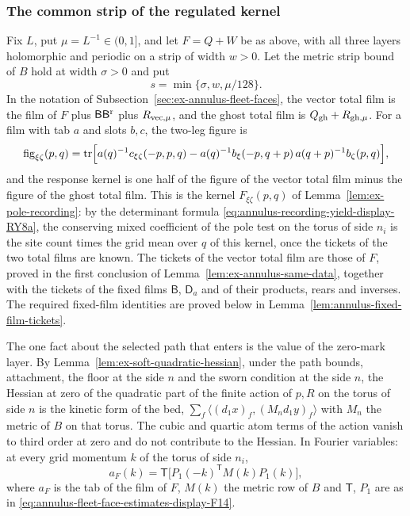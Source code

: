 \subsubsection{The common strip of the regulated kernel}

Fix $L$, put $\mu=L^{-1}\in(0,1]$, and let $F=Q+W$ be as above, with
all three layers holomorphic and periodic on a strip of width
$w>0$. Let the metric strip bound of $B$ hold at width $\sigma>0$ and
put
\[
 s=\min\{\sigma,w,\mu/128\}.
\]
In the notation of Subsection~\ref{sec:ex-annulus-fleet-faces}, the vector
total film is the film of $F$ plus $\mathsf B\mathsf B^{\rm r}$ plus
$R_{{\rm vec},\mu}$, and the ghost total film is
$Q_{\rm gh}+R_{{\rm gh},\mu}$. For a film with tab $a$ and slots
$b,c$, the two-leg figure is
\[
 \operatorname{fig}_{\xi\zeta}(p,q)=\operatorname{tr}\Bigl[
   a(q)^{-1}c_{\xi\zeta}(-p,p,q)
   -a(q)^{-1}b_\xi(-p,q+p)\,a(q+p)^{-1}b_\zeta(p,q)\Bigr],
\]
and the response kernel is one half of the figure of the vector total
film minus the figure of the ghost total film. This is the kernel
$F_{\xi\zeta}(p,q)$ of Lemma~\ref{lem:ex-pole-recording}: by the
determinant formula \eqref{eq:annulus-recording-yield-display-RY8a}, the conserving mixed coefficient of the pole
test on the torus of side $n_i$ is the site count times the grid mean
over $q$ of this kernel, once the tickets of the two total films are
known. The tickets of the vector total film are those of $F$, proved in
the first conclusion of Lemma~\ref{lem:ex-annulus-same-data}, together
with the tickets of the fixed films $\mathsf B$, $\mathsf D_a$ and of
their products, rears and inverses. The required fixed-film identities are proved below in
Lemma~\ref{lem:annulus-fixed-film-tickets}.

The one fact about the selected path that enters is the value of the
zero-mark layer. By Lemma~\ref{lem:ex-soft-quadratic-hessian}, under the
path bounds, attachment, the floor at the side $n$ and the sworn
condition at the side $n$, the Hessian at zero of the quadratic part of
the finite action of $p,R$ on the torus of side $n$ is the kinetic form
of the bed,
$\sum_f\langle(d_1x)_f,(M_nd_1y)_f\rangle$ with $M_n$ the metric of $B$
on that torus. The cubic and quartic atom terms of the action vanish to
third order at zero and do not contribute to the Hessian. In Fourier
variables: at every grid momentum $k$ of the
torus of side $n_i$,
\begin{equation}\label{eq:ex-annulus-zero-layer}
 a_F(k)=\mathsf T\bigl[P_1(-k)^{\mathsf T}M(k)P_1(k)\bigr],
\end{equation}
where $a_F$ is the tab of the film of $F$, $M(k)$ the metric row of $B$
and $\mathsf T$, $P_1$ are as in \eqref{eq:annulus-fleet-face-estimates-display-F14}.

